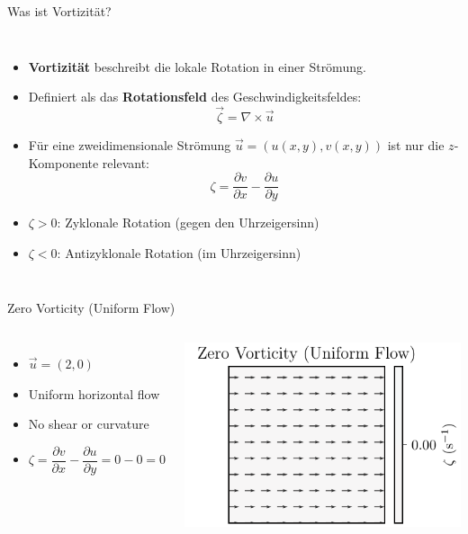 
\begin{frame}{Was ist Vortizität?}
	\begin{columns}
		\begin{itemize}
			\item \textbf{Vortizität} beschreibt die lokale Rotation in einer Strömung.
			\item Definiert als das \textbf{Rotationsfeld} des Geschwindigkeitsfeldes:
			      \[
				      \vec{\zeta} = \nabla \times \vec{u}
			      \]
			\item Für eine zweidimensionale Strömung \( \vec{u} = (u(x,y), v(x,y)) \) ist nur die \(z\)-Komponente relevant:
			      \[
				      \zeta = \dfrac{\partial v}{\partial x} - \frac{\partial u}{\partial y}
			      \]
			\item \(\zeta > 0\): Zyklonale Rotation (gegen den Uhrzeigersinn)
			\item \(\zeta < 0\): Antizyklonale Rotation (im Uhrzeigersinn)
		\end{itemize}

		\vspace{2cm}  %
	\end{columns}
\end{frame}


\begin{frame}{Zero Vorticity (Uniform Flow)}
	\begin{columns}
		\column{0.5\textwidth}
		\begin{itemize}
			\item \( \vec{u} = (2, 0) \)
			\item Uniform horizontal flow
			\item No shear or curvature
			\item \( \zeta = \dfrac{\partial v}{\partial x} - \dfrac{\partial u}{\partial y} = 0-0= 0 \)
		\end{itemize}

		\column{0.5\textwidth}
		\includegraphics[width=\linewidth]{../images/vorticity_plot0.pdf}
	\end{columns}
\end{frame}

